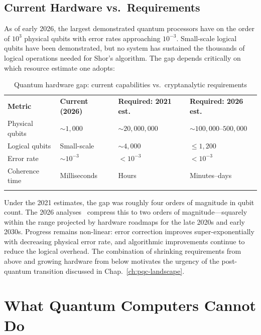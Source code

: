 \subsection{Current Hardware vs.\ Requirements}
\label{subsec:hardware-gap}

As of early 2026, the largest demonstrated quantum processors have on the order of $10^3$ physical qubits with error rates approaching $10^{-3}$.  Small-scale logical qubits have been demonstrated, but no system has sustained the thousands of logical operations needed for Shor's algorithm.  The gap depends critically on which resource estimate one adopts:

\begin{table}[t]
\caption{Quantum hardware gap: current capabilities vs.\ cryptanalytic requirements}
\label{tab:hardware-gap}
\begin{tabular}{p{3.5cm}p{2.5cm}p{2.5cm}p{2.5cm}}
\hline\noalign{\smallskip}
\textbf{Metric} & \textbf{Current (2026)} & \textbf{Required: 2021 est.} & \textbf{Required: 2026 est.} \\
\noalign{\smallskip}\svhline\noalign{\smallskip}
Physical qubits & $\sim 1{,}000$ & $\sim 20{,}000{,}000$ & $\sim 100{,}000$--$500{,}000$ \\
Logical qubits & Small-scale & $\sim 4{,}000$ & $\leq 1{,}200$ \\
Error rate & $\sim 10^{-3}$ & $< 10^{-3}$ & $< 10^{-3}$ \\
Coherence time & Milliseconds & Hours & Minutes--days \\
\noalign{\smallskip}\hline
\end{tabular}
\end{table}

Under the 2021 estimates, the gap was roughly four orders of magnitude in qubit count.  The 2026 analyses~\cite{BabbushZalcmanGidney2026,CainXuKing2026} compress this to two orders of magnitude---squarely within the range projected by hardware roadmaps for the late 2020s and early 2030s.  Progress remains non-linear: error correction improves super-exponentially with decreasing physical error rate, and algorithmic improvements continue to reduce the logical overhead.  The combination of shrinking requirements from above and growing hardware from below motivates the urgency of the post-quantum transition discussed in Chap.~\ref{ch:pqc-landscape}.


\section{What Quantum Computers Cannot Do}
\label{sec:quantum-limits}

